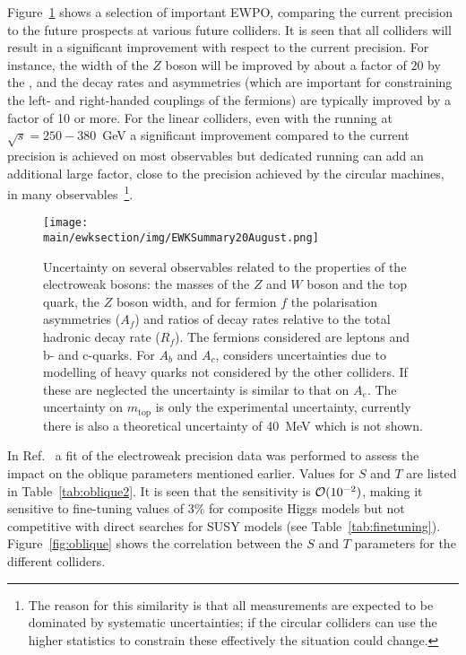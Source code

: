 \documentclass[../report.tex]{subfiles}
\providecommand{\main}{..}
\newcommand{\ew}{electroweak\xspace}
\begin{document}
Figure~\ref{fig:ewkpar} shows a selection of important EWPO, comparing the current precision to the future prospects at various future colliders. It is seen that all colliders will result in a significant improvement with respect to the current precision. For instance, the width of the $Z$ boson will be improved by about a factor of 20 by the \FCCee, and the decay rates and asymmetries (which are important for constraining the left- and right-handed couplings of the fermions) are typically improved by a factor of 10 or more. For the linear colliders, even with the running at $\sqrt{s}=250-380$~GeV a significant improvement compared to the current precision is achieved on most observables but dedicated running can add an additional large factor, close to the precision achieved by the circular machines, in many observables~\footnote{The reason for this similarity is that all measurements are expected to be dominated by systematic uncertainties; if the circular colliders can use the higher statistics to constrain these effectively the situation could change.}. 

\begin{figure}[htbp]
    \centering
    \texttt{[image: \\main/ewksection/img/EWKSummary20August.png]}
    \caption{Uncertainty on several observables related to the properties of the \ew bosons: the masses of the $Z$ and $W$ boson and the top quark, the $Z$ boson width, and for fermion $f$ the polarisation asymmetries ($A_f$) and ratios of decay rates relative to the total hadronic decay rate ($R_f$). The fermions considered are leptons and b- and c-quarks. For $A_b$ and $A_c$, \FCCee considers uncertainties due to modelling of heavy quarks not considered by the other colliders. If these are neglected the uncertainty is similar to that on $A_e$. The uncertainty on $m_\textrm{top}$ is only the experimental uncertainty, currently there is also a theoretical uncertainty of 40~MeV which is not shown.
    \label{fig:ewkpar}}
\end{figure}
    
In Ref.~\cite{deBlas:2019rxi} a fit of the \ew precision data was performed to assess the impact on the oblique parameters mentioned earlier. 
Values for $S$ and $T$ are listed in Table~\ref{tab:oblique2}. It is seen that the sensitivity is ${\cal O}(10^{-2})$, making it sensitive to fine-tuning values of 3\% for composite Higgs models but not competitive with direct searches for SUSY models (see Table~\ref{tab:finetuning}).  
Figure~\ref{fig:oblique} shows the correlation between the $S$ and $T$ parameters for the different colliders.
\end{document}
